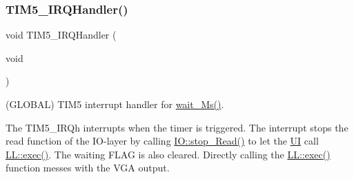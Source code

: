 \subsubsection{\texorpdfstring{T\+I\+M5\+\_\+\+I\+R\+Q\+Handler()}{TIM5\_IRQHandler()}}
{\footnotesize\ttfamily void T\+I\+M5\+\_\+\+I\+R\+Q\+Handler (\begin{DoxyParamCaption}\item[{void}]{ }\end{DoxyParamCaption})}



(G\+L\+O\+B\+AL) T\+I\+M5 interrupt handler for \mbox{\hyperlink{namespace_l_l_ab30bdedb41438098df71bea7d5eb624d}{wait\+\_\+\+Ms()}}. 

The T\+I\+M5\+\_\+\+I\+R\+Qh interrupts when the timer is triggered. The interrupt stops the read function of the I\+O-\/layer by calling \mbox{\hyperlink{namespace_i_o_a04c5db8c053f07761c5c09894a4bd49d}{I\+O\+::stop\+\_\+\+Read()}} to let the \mbox{\hyperlink{namespace_u_i}{UI}} call \mbox{\hyperlink{namespace_l_l_ac98bc19f4e3468b76cfc2e43456527cc}{L\+L\+::exec()}}. The waiting F\+L\+AG is also cleared. Directly calling the \mbox{\hyperlink{namespace_l_l_ac98bc19f4e3468b76cfc2e43456527cc}{L\+L\+::exec()}} function messes with the V\+GA output.


